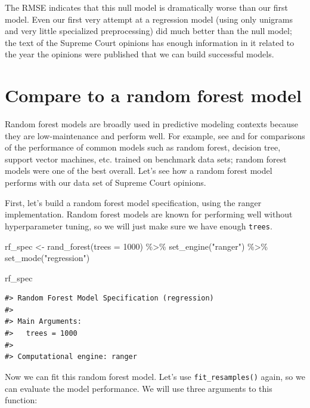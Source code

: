 \documentclass[
]{krantz}
\makeatletter
\newenvironment{Shaded}{\begin{snugshade}}{\end{snugshade}}
\newcommand{\AttributeTok}[1]{\textcolor[rgb]{0.77,0.63,0.00}{#1}}
\newcommand{\DecValTok}[1]{\textcolor[rgb]{0.00,0.00,0.81}{#1}}
\newcommand{\FunctionTok}[1]{\textcolor[rgb]{0.00,0.00,0.00}{#1}}
\newcommand{\NormalTok}[1]{#1}
\newcommand{\OtherTok}[1]{\textcolor[rgb]{0.56,0.35,0.01}{#1}}
\newcommand{\SpecialCharTok}[1]{\textcolor[rgb]{0.00,0.00,0.00}{#1}}
\newcommand{\StringTok}[1]{\textcolor[rgb]{0.31,0.60,0.02}{#1}}
\newenvironment{kframe}{%
\medskip{}
\setlength{\fboxsep}{.8em}
 \def\at@end@of@kframe{}%
 \ifinner\ifhmode%
  \def\at@end@of@kframe{\end{minipage}}%
  \begin{minipage}{\columnwidth}%
 \fi\fi%
 \def\FrameCommand##1{\hskip\@totalleftmargin \hskip-\fboxsep
 \colorbox{shadecolor}{##1}\hskip-\fboxsep
     \hskip-\linewidth \hskip-\@totalleftmargin \hskip\columnwidth}%
 \MakeFramed {\advance\hsize-\width
   \@totalleftmargin\z@ \linewidth\hsize
   \@setminipage}}%
 {\par\unskip\endMakeFramed%
 \at@end@of@kframe}
\renewenvironment{Shaded}{\begin{kframe}}{\end{kframe}}
\makeatother
\begin{document}
The RMSE indicates that this null model is dramatically worse than our first model. Even our first very attempt at a regression model (using only unigrams and very little specialized preprocessing) did much better than the null model; the text of the Supreme Court opinions has enough information in it related to the year the opinions were published that we can build successful models.

\hypertarget{comparerf}{%
\section{Compare to a random forest model}\label{comparerf}}

Random forest models are broadly used in predictive modeling contexts because they are low-maintenance and perform well. For example, see \citet{Caruana2008} and \citet{Olson2017} for comparisons of the performance of common models such as random forest, decision tree, support vector machines, etc. trained on benchmark data sets; random forest models were one of the best overall. Let's see how a random forest model performs with our data set of Supreme Court opinions.

First, let's build a random forest model specification, using the ranger implementation. Random forest models are known for performing well without hyperparameter tuning, so we will just make sure we have enough \texttt{trees}.

\begin{Shaded}
\begin{Highlighting}[]
\NormalTok{rf\_spec }\OtherTok{\textless{}{-}} \FunctionTok{rand\_forest}\NormalTok{(}\AttributeTok{trees =} \DecValTok{1000}\NormalTok{) }\SpecialCharTok{\%\textgreater{}\%}
  \FunctionTok{set\_engine}\NormalTok{(}\StringTok{"ranger"}\NormalTok{) }\SpecialCharTok{\%\textgreater{}\%}
  \FunctionTok{set\_mode}\NormalTok{(}\StringTok{"regression"}\NormalTok{)}

\NormalTok{rf\_spec}
\end{Highlighting}
\end{Shaded}

\begin{verbatim}
#> Random Forest Model Specification (regression)
#> 
#> Main Arguments:
#>   trees = 1000
#> 
#> Computational engine: ranger
\end{verbatim}

Now we can fit this random forest model. Let's use \texttt{fit\_resamples()} again, so we can evaluate the model performance. We will use three arguments to this function:
\end{document}
